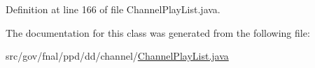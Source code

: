 Definition at line 166 of file Channel\-Play\-List.\-java.



The documentation for this class was generated from the following file\-:\begin{DoxyCompactItemize}
\item 
src/gov/fnal/ppd/dd/channel/\hyperlink{ChannelPlayList_8java}{Channel\-Play\-List.\-java}\end{DoxyCompactItemize}
